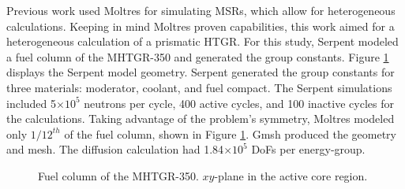 Previous work \cite{lindsay_introduction_2018}\cite{pater_multiphysics_2019} used Moltres for simulating \glspl{MSR}, which allow for heterogeneous calculations.
Keeping in mind Moltres proven capabilities, this work aimed for a heterogeneous calculation of a prismatic \gls{HTGR}.
For this study, Serpent modeled a fuel column of the MHTGR-350 and generated the group constants.
Figure \ref{fig:fuelcolumn} displays the Serpent model geometry.
Serpent generated the group constants for three materials: moderator, coolant, and fuel compact.
The Serpent simulations included 5$\times 10^5$ neutrons per cycle, 400 active cycles, and 100 inactive cycles for the calculations.
Taking advantage of the problem's symmetry, Moltres modeled only $1/12^{th}$ of the fuel column, shown in Figure \ref{fig:fuelcolumn}.
Gmsh \cite{geuzaine_gmsh_2020} produced the geometry and mesh.
The diffusion calculation had 1.84$\times 10^5$ \glspl{DoF} per energy-group.

\begin{figure}[htbp!]
	\centering
	\hfill
    \caption{Fuel column of the MHTGR-350. $xy$-plane in the active core region.}
	\label{fig:fuelcolumn}
\end{figure}

